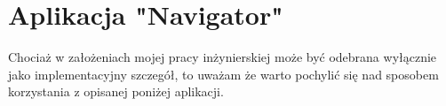 \section{Aplikacja "Navigator"} \label{NavigatorAppSection}

Chociaż w założeniach mojej pracy inżynierskiej może być odebrana wyłącznie jako implementacyjny szczegół, 
to uważam że warto pochylić się nad sposobem korzystania z opisanej poniżej aplikacji.





